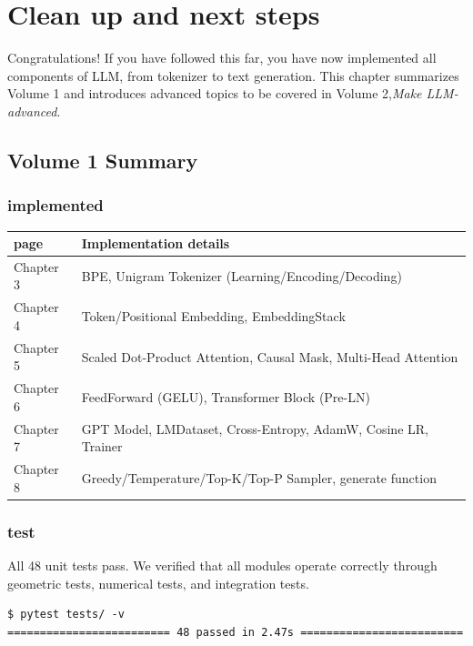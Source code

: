 \chapter{Clean up and next steps}
\label{ch:wrapup}

Congratulations! If you have followed this far, you have now implemented all components of LLM, from tokenizer to text generation. This chapter summarizes Volume 1 and introduces advanced topics to be covered in Volume 2,\textit{Make LLM-advanced}.

\section{Volume 1 Summary}

\subsection{implemented}

\begin{center}
\begin{tabularx}{\textwidth}{lX}
\toprule
\textbf{page}&\textbf{Implementation details}\\
\midrule
Chapter 3 & BPE, Unigram Tokenizer (Learning/Encoding/Decoding) \\
Chapter 4 & Token/Positional Embedding, EmbeddingStack \\
Chapter 5 & Scaled Dot-Product Attention, Causal Mask, Multi-Head Attention \\
Chapter 6 & FeedForward (GELU), Transformer Block (Pre-LN) \\
Chapter 7 & GPT Model, LMDataset, Cross-Entropy, AdamW, Cosine LR, Trainer \\
Chapter 8 & Greedy/Temperature/Top-K/Top-P Sampler, generate function \\
\bottomrule
\end{tabularx}
\end{center}

\subsection{test}

All 48 unit tests pass. We verified that all modules operate correctly through geometric tests, numerical tests, and integration tests.

\begin{lstlisting}[style=bashstyle]
$ pytest tests/ -v
========================= 48 passed in 2.47s =========================
\end{lstlisting}

